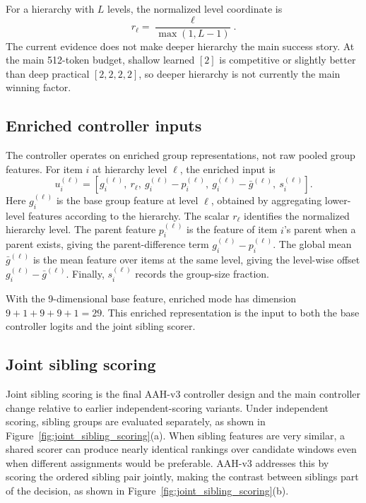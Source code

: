 \documentclass[11pt]{article}
\begin{document}
For a hierarchy with \(L\) levels, the normalized level coordinate is
\[
  r_\ell = \frac{\ell}{\max(1, L-1)}.
\]
The current evidence does not make deeper hierarchy the main success story. At the main 512-token budget, shallow learned \([2]\) is competitive or slightly better than deep practical \([2,2,2,2]\), so deeper hierarchy is not currently the main winning factor.

\subsection{Enriched controller inputs}

The controller operates on enriched group representations, not raw pooled group features. For item \(i\) at hierarchy level \(\ell\), the enriched input is
\[
  u_i^{(\ell)} = [g_i^{(\ell)},\ r_\ell,\ g_i^{(\ell)} - p_i^{(\ell)},\ g_i^{(\ell)} - \bar g^{(\ell)},\ s_i^{(\ell)}].
\]
Here \(g_i^{(\ell)}\) is the base group feature at level \(\ell\), obtained by aggregating lower-level features according to the hierarchy. The scalar \(r_\ell\) identifies the normalized hierarchy level. The parent feature \(p_i^{(\ell)}\) is the feature of item \(i\)'s parent when a parent exists, giving the parent-difference term \(g_i^{(\ell)}-p_i^{(\ell)}\). The global mean \(\bar g^{(\ell)}\) is the mean feature over items at the same level, giving the level-wise offset \(g_i^{(\ell)}-\bar g^{(\ell)}\). Finally, \(s_i^{(\ell)}\) records the group-size fraction.

With the 9-dimensional base feature, enriched mode has dimension \(9+1+9+9+1=29\). This enriched representation is the input to both the base controller logits and the joint sibling scorer.

\subsection{Joint sibling scoring}

Joint sibling scoring is the final AAH-v3 controller design and the main controller change relative to earlier independent-scoring variants. Under independent scoring, sibling groups are evaluated separately, as shown in Figure~\ref{fig:joint_sibling_scoring}(a). When sibling features are very similar, a shared scorer can produce nearly identical rankings over candidate windows even when different assignments would be preferable. AAH-v3 addresses this by scoring the ordered sibling pair jointly, making the contrast between siblings part of the decision, as shown in Figure~\ref{fig:joint_sibling_scoring}(b).
\end{document}
